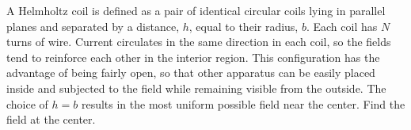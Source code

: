 A Helmholtz coil is defined as a pair of identical
circular coils lying in parallel planes and
separated by a distance, $h$, equal to their
radius, $b$. Each coil has $N$ turns of wire.
 Current circulates in the same direction in each
coil, so the fields tend to reinforce each other in the
interior region. This configuration has the advantage of
being fairly open, so that other apparatus can be easily
placed inside and subjected to the field while remaining
visible from the outside. The choice of $h=b$ results in the
most uniform possible field near the center.
Find the field at the center.\answercheck
